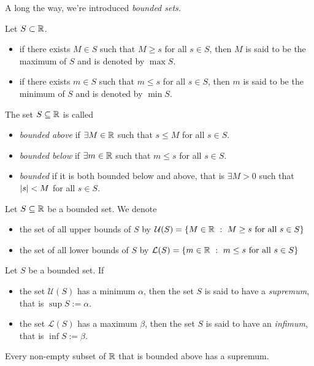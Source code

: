 A long the way, we're introduced \emph{bounded sets.}
\begin{definition}
  Let $S\subset\mathbb{R}$.
  \begin{itemize}
    \item if there exists $M\in S$ such that 
      $M\geq s$ for all $s\in S$, then $M$ is said to be the
      maximum of $S$ and is denoted by $\max S$.
    \item if there exists $m\in S$ such that 
      $m\leq s$ for all $s\in S$, then $m$ is said to be the
      minimum of $S$ and is denoted by $\min S$.
  \end{itemize}
\end{definition}
\begin{definition}
  The set $S\subseteq\mathbb{R}$ is called
  \begin{itemize}
    \item \emph{bounded above} if $\exists M\in\mathbb{R}$ such that 
      $s\leq M$ for all $s\in S$.
    \item \emph{bounded below} if $\exists m\in\mathbb{R}$  such that
      $m\leq s$ for all $s\in S$.
    \item \emph{bounded} if it is both bounded below and above, 
      that is $\exists M>0$ such that $\lvert s\rvert<M$ for all $s\in S$.
  \end{itemize}
\end{definition}
\begin{definition}
  Let $S\subseteq\mathbb{R}$ be a bounded set. We denote
  \begin{itemize}
    \item the set of all upper bounds of $S$ by 
      $\mathcal{U}(S)=\left\{M\in\mathbb{R} ~:~ M\geq s \text{ for all }s\in S\right\}$
    \item the set of all lower bounds of $S$ by
      $\mathcal{L}(S)=\left\{m\in\mathbb{R} ~:~ m\leq s\text{ for all }s\in S\right\}$
  \end{itemize}
\end{definition}
\begin{definition}
  Let $S$ be a bounded set. If
  \begin{itemize}
    \item the set $\mathcal{U}(S)$ has a minimum $\alpha$, then the set
      $S$ is said to have a \emph{supremum}, that is
      $\sup S:=\alpha$.
    \item the set $\mathcal{L}(S)$ has a maximum $\beta$,
      then the set $S$ is said to have an \emph{infimum}, that is
      $\inf S:=\beta$.
  \end{itemize}
\end{definition}
\begin{axiom}
  Every non-empty subset of $\mathbb{R}$ that is bounded above 
  has a supremum.
\end{axiom}


